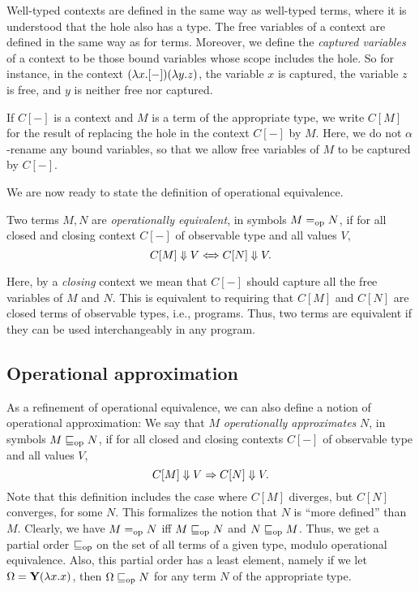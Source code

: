 \documentclass{article}
\begin{document}
Well-typed contexts are defined in the same way as well-typed terms,
where it is understood that the hole also has a type. The free
variables of a context are defined in the same way as for terms.
Moreover, we define the {\em captured variables} of a context to be
those bound variables whose scope includes the hole.  So for instance,
in the context $(\lambda x.[-])(\lambda y.z)$, the variable $x$ is captured,
the variable $z$ is free, and $y$ is neither free nor captured. 

If $C[-]$ is a context and $M$ is a term of the appropriate type, we
write $C[M]$ for the result of replacing the hole in the context
$C[-]$ by $M$. Here, we do not $\alpha$-rename any bound variables, so
that we allow free variables of $M$ to be captured by $C[-]$.

We are now ready to state the definition of operational equivalence.

\begin{definition}
  Two terms $M,N$ are {\em operationally equivalent}, in symbols
  $M=_{\rm op} N$, if for all closed and closing context $C[-]$ of
  observable type and all values $V$,
  \[ C[M]\Downarrow V \Leftarrow\!\!\!\Rightarrow C[N]\Downarrow V.
  \]
\end{definition}

Here, by a {\em closing} context we mean that $C[-]$ should capture
all the free variables of $M$ and $N$. This is equivalent to requiring
that $C[M]$ and $C[N]$ are closed terms of observable types, i.e.,
programs. Thus, two terms are equivalent if they can be used
interchangeably in any program.

\subsection{Operational approximation}

As a refinement of operational equivalence, we can also define a
notion of operational approximation: We say that $M$ {\em
  operationally approximates} $N$, in symbols $M\sqsubseteq_{\rm op} N$, if for
all closed and closing contexts $C[-]$ of observable type and all
values $V$,
\[ C[M]\Downarrow V \Rightarrow C[N]\Downarrow V.
\]
Note that this definition includes the case where $C[M]$ diverges, but
$C[N]$ converges, for some $N$. This formalizes the notion that $N$ is
``more defined'' than $M$. Clearly, we have $M=_{\rm op} N$ iff $M\sqsubseteq_{\rm op}
N$ and $N\sqsubseteq_{\rm op} M$. Thus, we get a partial order $\sqsubseteq_{\rm op}$ on the
set of all terms of a given type, modulo operational equivalence.
Also, this partial order has a least element, namely if we let
$\Omega={\bf Y}(\lambda x.x)$, then $\Omega\sqsubseteq_{\rm op} N$ for any term $N$ of the
appropriate type.
\end{document}

